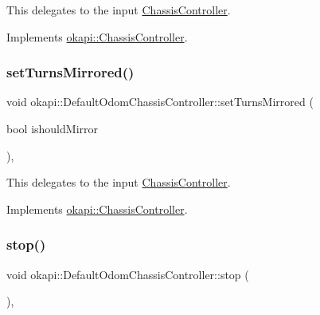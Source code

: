 This delegates to the input \mbox{\hyperlink{classokapi_1_1ChassisController}{Chassis\+Controller}}. 

Implements \mbox{\hyperlink{classokapi_1_1ChassisController_a24b46ec1c42f32c0527d57738a07820a}{okapi\+::\+Chassis\+Controller}}.

\mbox{\label{classokapi_1_1DefaultOdomChassisController_aed92ba0b7a9fc15bf645f3789e8598ae}} 
\subsubsection{\texorpdfstring{setTurnsMirrored()}{setTurnsMirrored()}}
{\footnotesize\ttfamily void okapi\+::\+Default\+Odom\+Chassis\+Controller\+::set\+Turns\+Mirrored (\begin{DoxyParamCaption}\item[{bool}]{ishould\+Mirror }\end{DoxyParamCaption})\hspace{0.3cm}{\ttfamily [override]}, {\ttfamily [virtual]}}

This delegates to the input \mbox{\hyperlink{classokapi_1_1ChassisController}{Chassis\+Controller}}. 

Implements \mbox{\hyperlink{classokapi_1_1ChassisController_a37ae36ec8936272eb31e3baed7eed417}{okapi\+::\+Chassis\+Controller}}.

\mbox{\label{classokapi_1_1DefaultOdomChassisController_af6a98415e2c4e17dfec77e215efb1a41}} 
\subsubsection{\texorpdfstring{stop()}{stop()}}
{\footnotesize\ttfamily void okapi\+::\+Default\+Odom\+Chassis\+Controller\+::stop (\begin{DoxyParamCaption}{ }\end{DoxyParamCaption})\hspace{0.3cm}{\ttfamily [override]}, {\ttfamily [virtual]}}

